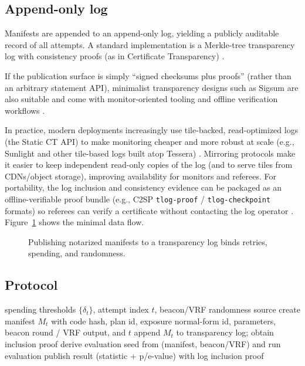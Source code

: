 \documentclass[11pt]{article}
\begin{document}
\subsection{Append-only log}
Manifests are appended to an append-only log, yielding a publicly auditable record of all attempts.
A standard implementation is a Merkle-tree transparency log with consistency proofs (as in Certificate Transparency) \cite{rfc9162}.

If the publication surface is simply ``signed checksums plus proofs'' (rather than an arbitrary statement API), minimalist transparency designs such as Sigsum are also suitable and come with monitor-oriented tooling and offline verification workflows \cite{sigsum_site,sigsum_design,sigsum_getting_started}.

In practice, modern deployments increasingly use tile-backed, read-optimized logs (the Static CT API) to make monitoring cheaper and more robust at scale (e.g., Sunlight and other tile-based logs built atop Tessera) \cite{ct_static_2025,sunlight_intro_2024,static_ct_api_spec,tessera_github}.
Mirroring protocols make it easier to keep independent read-only copies of the log (and to serve tiles from CDNs/object storage), improving availability for monitors and referees. \cite{c2sp_tlog_mirror}
For portability, the log inclusion and consistency evidence can be packaged as an offline-verifiable proof bundle (e.g., C2SP \texttt{tlog-proof} / \texttt{tlog-checkpoint} formats) so referees can verify a certificate without contacting the log operator \cite{c2sp_tlog_proof,c2sp_tlog_checkpoint}.
Figure~\ref{fig:log_diagram} shows the minimal data flow.

\begin{figure}[t]
\centering
{}
\caption{Publishing notarized manifests to a transparency log binds retries, spending, and randomness.}
\label{fig:log_diagram}
\end{figure}

\subsection{Protocol}
\begin{algorithm}[t]
\caption{Log-enforced attempt}\label{alg:log_attempt}
\begin{algorithmic}[1]
\Require spending thresholds $\{\delta_t\}$, attempt index $t$, beacon/VRF randomness source
\State create manifest $M_t$ with code hash, plan id, exposure normal-form id, parameters, beacon round / VRF output, and $t$
\State append $M_t$ to transparency log; obtain inclusion proof
\State derive evaluation seed from (manifest, beacon/VRF) and run evaluation
\State publish result (statistic + p/e-value) with log inclusion proof
\end{algorithmic}
\end{algorithm}
\end{document}
